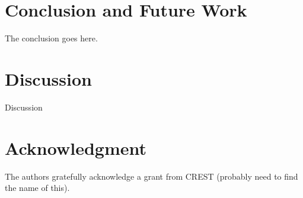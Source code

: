 \documentclass[conference]{IEEEtran}
\begin{document}


\section{Conclusion and Future Work}
The conclusion goes here.

\section{Discussion}
Discussion


\section*{Acknowledgment}
The authors gratefully acknowledge a grant from CREST (probably need to find the name of this).



\printbibliography
\end{document}
